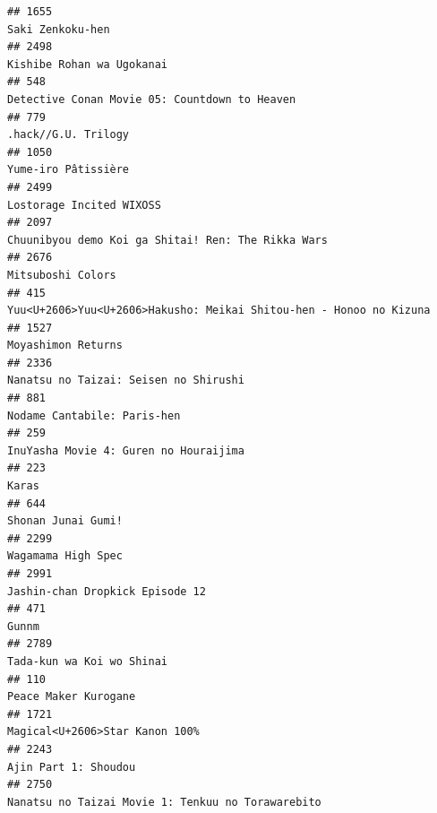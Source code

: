 \documentclass[
]{article}
\begin{document}
\begin{verbatim}
## 1655                                                                                          Saki Zenkoku-hen
## 2498                                                                                 Kishibe Rohan wa Ugokanai
## 548                                                              Detective Conan Movie 05: Countdown to Heaven
## 779                                                                                        .hack//G.U. Trilogy
## 1050                                                                                       Yume-iro Pâtissière
## 2499                                                                                  Lostorage Incited WIXOSS
## 2097                                                        Chuunibyou demo Koi ga Shitai! Ren: The Rikka Wars
## 2676                                                                                         Mitsuboshi Colors
## 415                                         Yuu<U+2606>Yuu<U+2606>Hakusho: Meikai Shitou-hen - Honoo no Kizuna
## 1527                                                                                        Moyashimon Returns
## 2336                                                                     Nanatsu no Taizai: Seisen no Shirushi
## 881                                                                                Nodame Cantabile: Paris-hen
## 259                                                                      InuYasha Movie 4: Guren no Houraijima
## 223                                                                                                      Karas
## 644                                                                                         Shonan Junai Gumi!
## 2299                                                                                        Wagamama High Spec
## 2991                                                                           Jashin-chan Dropkick Episode 12
## 471                                                                                                      Gunnm
## 2789                                                                                 Tada-kun wa Koi wo Shinai
## 110                                                                                       Peace Maker Kurogane
## 1721                                                                            Magical<U+2606>Star Kanon 100%
## 2243                                                                                      Ajin Part 1: Shoudou
## 2750                                                         Nanatsu no Taizai Movie 1: Tenkuu no Torawarebito

\end{verbatim}
\end{document}
